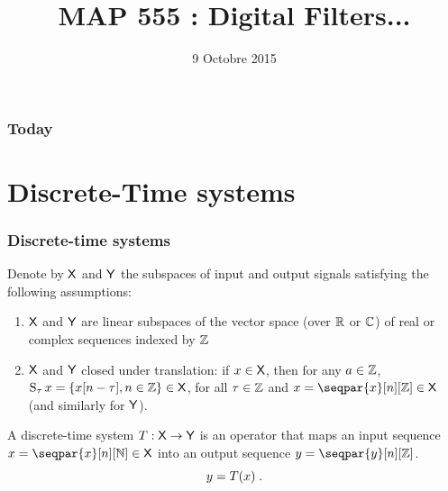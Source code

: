 

\title{MAP 555 : Digital Filters...}

\date{9 Octobre 2015}
\maketitle



\begin{frame}
\frametitle{Today}
\tableofcontents
\end{frame}

\section{Discrete-Time systems}
\begin{frame}
\frametitle{Discrete-time systems}
Denote by $\mathsf{X}$ and $\mathsf{Y}$ the subspaces  of input and output signals satisfying the following assumptions:
\begin{enumerate}
\item $\mathsf{X}$ and $\mathsf{Y}$ are  linear subspaces of the vector space  (over $\mathbb{R}$ or $\mathbb{C}$) of real or complex sequences indexed by $\mathbb{Z}$
\item $\mathsf{X}$ and $\mathsf{Y}$ closed under translation: if $x \in \mathsf{X}$, then for any $a \in \mathbb{Z}$, $\operatorname{S}_\tau x= \{ x[n-\tau], n \in \mathbb{Z} \} \in \mathsf{X}$, for all $\tau \in \mathbb{Z}$ and $x= \seqpar{x}[n][\zset] \in \Xset$ (and similarly for $\mathsf{Y}$).
\end{enumerate}
\begin{definition}
A discrete-time system $T: \mathsf{X} \to \mathsf{Y}$ is an operator that maps an input sequence $x= \seqpar{x}[n][\nset] \in \Xset$ into an output sequence $y= \seqpar{y}[n][\zset]$.
\alert{$$
y=T(x) \;.
$$
}
\end{definition}
\end{frame}

